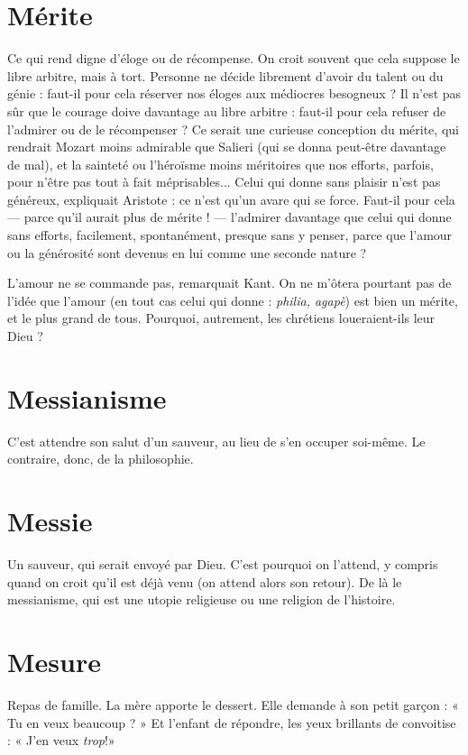 \section{Mérite}
Ce qui rend digne d’éloge ou de récompense. On croit souvent
que cela suppose le libre arbitre, mais à tort. Personne ne décide
librement d’avoir du talent ou du génie : faut-il pour cela réserver nos éloges
aux médiocres besogneux ? Il n’est pas sûr que le courage doive davantage au
libre arbitre : faut-il pour cela refuser de l’admirer ou de le récompenser ? Ce
serait une curieuse conception du mérite, qui rendrait Mozart moins admirable
que Salieri (qui se donna peut-être davantage de mal), et la sainteté ou
l’héroïsme moins méritoires que nos efforts, parfois, pour n'être pas tout à fait
méprisables...
Celui qui donne sans plaisir n’est pas généreux, expliquait Aristote : ce
n’est qu’un avare qui se force. Faut-il pour cela — parce qu’il aurait plus de
mérite ! — l’admirer davantage que celui qui donne sans efforts, facilement,
spontanément, presque sans y penser, parce que l’amour ou la générosité sont
devenus en lui comme une seconde nature ?

L'amour ne se commande pas, remarquait Kant. On ne m'ôtera pourtant
pas de l’idée que l’amour (en tout cas celui qui donne : {\it philia, agapè}) est bien
un mérite, et le plus grand de tous. Pourquoi, autrement, les chrétiens
loueraient-ils leur Dieu ?

\section{Messianisme}
C'est attendre son salut d’un sauveur, au lieu de s’en
occuper soi-même. Le contraire, donc, de la philosophie.

\section{Messie}
Un sauveur, qui serait envoyé par Dieu. C’est pourquoi on l'attend,
y compris quand on croit qu’il est déjà venu (on attend alors son
retour). De là le messianisme, qui est une utopie religieuse ou une religion de
l’histoire.

\section{Mesure}
Repas de famille. La mère apporte le dessert. Elle demande à son
petit garçon : « Tu en veux beaucoup ? » Et l'enfant de répondre,
les yeux brillants de convoitise : « J’en veux {\it trop}!»

